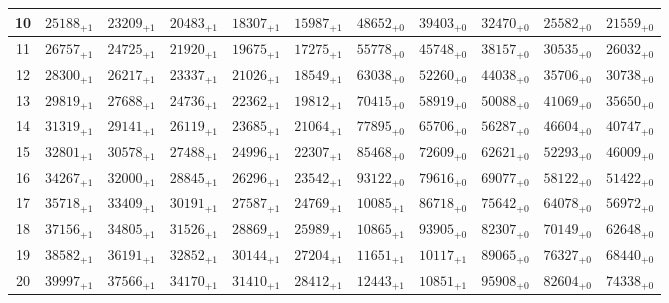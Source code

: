 \documentclass[10pt, a4paper]{article}
\begin{document}
\begin{center}
\begin{longtable}{c || c c c c c | c c c c c}
        10 & \({25188}_{+1}\) & \({23209}_{+1}\) & \({20483}_{+1}\) & \({18307}_{+1}\) & \({15987}_{+1}\) & \({48652}_{+0}\) & \({39403}_{+0}\) & \({32470}_{+0}\) & \({25582}_{+0}\) & \({21559}_{+0}\)\\
        \hline
        11 & \({26757}_{+1}\) & \({24725}_{+1}\) & \({21920}_{+1}\) & \({19675}_{+1}\) & \({17275}_{+1}\) & \({55778}_{+0}\) & \({45748}_{+0}\) & \({38157}_{+0}\) & \({30535}_{+0}\) & \({26032}_{+0}\)\\
        12 & \({28300}_{+1}\) & \({26217}_{+1}\) & \({23337}_{+1}\) & \({21026}_{+1}\) & \({18549}_{+1}\) & \({63038}_{+0}\) & \({52260}_{+0}\) & \({44038}_{+0}\) & \({35706}_{+0}\) & \({30738}_{+0}\)\\
        13 & \({29819}_{+1}\) & \({27688}_{+1}\) & \({24736}_{+1}\) & \({22362}_{+1}\) & \({19812}_{+1}\) & \({70415}_{+0}\) & \({58919}_{+0}\) & \({50088}_{+0}\) & \({41069}_{+0}\) & \({35650}_{+0}\)\\
        14 & \({31319}_{+1}\) & \({29141}_{+1}\) & \({26119}_{+1}\) & \({23685}_{+1}\) & \({21064}_{+1}\) & \({77895}_{+0}\) & \({65706}_{+0}\) & \({56287}_{+0}\) & \({46604}_{+0}\) & \({40747}_{+0}\)\\
        15 & \({32801}_{+1}\) & \({30578}_{+1}\) & \({27488}_{+1}\) & \({24996}_{+1}\) & \({22307}_{+1}\) & \({85468}_{+0}\) & \({72609}_{+0}\) & \({62621}_{+0}\) & \({52293}_{+0}\) & \({46009}_{+0}\)\\
        \hline
        16 & \({34267}_{+1}\) & \({32000}_{+1}\) & \({28845}_{+1}\) & \({26296}_{+1}\) & \({23542}_{+1}\) & \({93122}_{+0}\) & \({79616}_{+0}\) & \({69077}_{+0}\) & \({58122}_{+0}\) & \({51422}_{+0}\)\\
        17 & \({35718}_{+1}\) & \({33409}_{+1}\) & \({30191}_{+1}\) & \({27587}_{+1}\) & \({24769}_{+1}\) & \({10085}_{+1}\) & \({86718}_{+0}\) & \({75642}_{+0}\) & \({64078}_{+0}\) & \({56972}_{+0}\)\\
        18 & \({37156}_{+1}\) & \({34805}_{+1}\) & \({31526}_{+1}\) & \({28869}_{+1}\) & \({25989}_{+1}\) & \({10865}_{+1}\) & \({93905}_{+0}\) & \({82307}_{+0}\) & \({70149}_{+0}\) & \({62648}_{+0}\)\\
        19 & \({38582}_{+1}\) & \({36191}_{+1}\) & \({32852}_{+1}\) & \({30144}_{+1}\) & \({27204}_{+1}\) & \({11651}_{+1}\) & \({10117}_{+1}\) & \({89065}_{+0}\) & \({76327}_{+0}\) & \({68440}_{+0}\)\\
        20 & \({39997}_{+1}\) & \({37566}_{+1}\) & \({34170}_{+1}\) & \({31410}_{+1}\) & \({28412}_{+1}\) & \({12443}_{+1}\) & \({10851}_{+1}\) & \({95908}_{+0}\) & \({82604}_{+0}\) & \({74338}_{+0}\)\\

\end{longtable}
\end{center}
\end{document}
